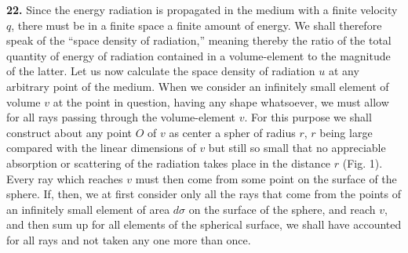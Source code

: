 \documentclass[12pt,oneside]{book}
\begin{document}
\textbf{22.} Since the energy radiation is propagated in the medium with a finite velocity $q$, there must be in a finite space a finite amount of energy. We shall therefore speak of the ``space density of radiation,'' meaning thereby the ratio of the total quantity of energy of radiation contained in a volume-element to the magnitude of the latter. Let us now calculate the space density of radiation $u$ at any arbitrary point of the medium. When we consider an infinitely small element of volume $v$ at the point in question, having any shape whatsoever, we must allow for all rays passing through the volume-element $v$. For this purpose we shall construct about any point $O$ of $v$ as center a spher of radius $r$, $r$ being large compared with the linear dimensions of $v$ but still so small that no appreciable absorption or scattering of the radiation takes place in the distance $r$ (Fig. 1). Every ray which reaches $v$ must then come from some point on the surface of the sphere. If, then, we at first consider only all the rays that come from the points of an infinitely small element of area $d\sigma$ on the surface of the sphere, and reach $v$, and then sum up for all elements of the spherical surface, we shall have accounted for all rays and not taken any one more than once. \par 
\begin{center}
\end{center}
\end{document}
